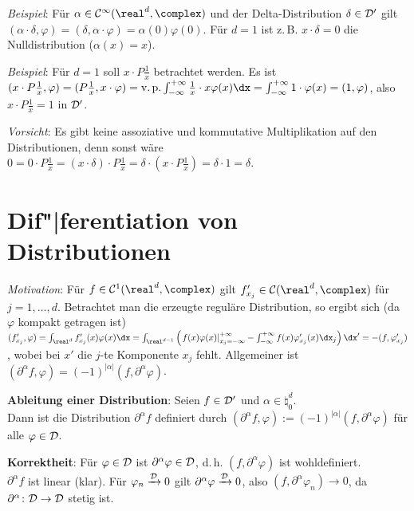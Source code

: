 \emph{Beispiel}:
Für $\alpha \in \C^\infty(\real^d, \complex)$ und der Delta-Distribution
$\delta \in \mathcal{D}'$ gilt $(\alpha \cdot \delta, \varphi) =
(\delta, \alpha \cdot \varphi) = \alpha(0) \varphi(0)$.
Für $d = 1$ ist z.\,B. $x \cdot \delta = 0$ die Nulldistribution
($\alpha(x) = x$).

\emph{Beispiel}:
Für $d = 1$ soll $x \cdot P \frac{1}{x}$ betrachtet werden.
Es ist\\
$(x \cdot P \frac{1}{x}, \varphi) = (P \frac{1}{x}, x \cdot \varphi) =
\vp\int_{-\infty}^{+\infty} \frac{1}{x} \cdot x \varphi(x) \dx =
\int_{-\infty}^{+\infty} 1 \cdot \varphi(x) = (1, \varphi)$, also
$x \cdot P \frac{1}{x} = 1$ in $\mathcal{D}'$.

\emph{Vorsicht}:
Es gibt keine assoziative und kommutative Multiplikation auf den
Distributionen, denn sonst wäre
$0 = 0 \cdot P \frac{1}{x} = (x \cdot \delta) \cdot P \frac{1}{x} =
\delta \cdot (x \cdot P \frac{1}{x}) = \delta \cdot 1 = \delta$.

\pagebreak

\section{%
    Dif"|ferentiation von Distributionen%
}

\emph{Motivation}:
Für $f \in \C^1(\real^d, \complex)$ gilt
$f'_{x_j} \in \C(\real^d, \complex)$ für $j = 1, \dotsc, d$.
Betrachtet man die erzeugte reguläre Distribution, so ergibt sich
(da $\varphi$ kompakt getragen ist)\\
$(f'_{x_j}, \varphi) = \int_{\real^d} f'_{x_j}(x) \varphi(x) \dx =
\int_{\real^{d-1}} \left(\left.f(x) \varphi(x)\right|_{x_j=-\infty}^{+\infty} -
\int_{-\infty}^{+\infty} f(x) \varphi'_{x_j}(x) \dx_j\right) \dx' =
-(f, \varphi'_{x_j})$, wobei bei $x'$ die $j$-te Komponente $x_j$ fehlt.
Allgemeiner ist $(\partial^\alpha f, \varphi) =
(-1)^{|\alpha|} (f, \partial^\alpha \varphi)$.

\textbf{Ableitung einer Distribution}:
Seien $f \in \mathcal{D}'$ und $\alpha \in \natural_0^d$.\\
Dann ist die Distribution $\partial^\alpha f$ definiert durch
$(\partial^\alpha f, \varphi) := (-1)^{|\alpha|} (f, \partial^\alpha \varphi)$
für alle $\varphi \in \mathcal{D}$.

\textbf{Korrektheit}:
Für $\varphi \in \mathcal{D}$ ist $\partial^\alpha \varphi \in \mathcal{D}$, d.\,h.
$(f, \partial^\alpha \varphi)$ ist wohldefiniert.\\
$\partial^\alpha f$ ist linear (klar).
Für $\varphi_n \xrightarrow{\mathcal{D}} 0$ gilt
$\partial^\alpha \varphi \xrightarrow{\mathcal{D}} 0$, also
$(f, \partial^\alpha \varphi_n) \to 0$, da
$\partial^\alpha\colon \mathcal{D} \rightarrow \mathcal{D}$ stetig ist.

